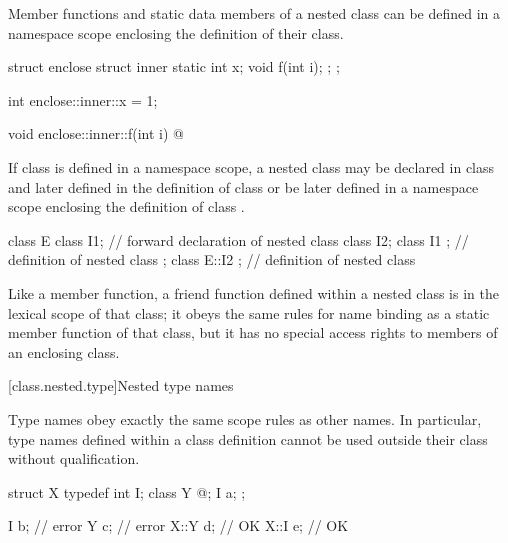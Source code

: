 \pnum
Member functions and static data members of a nested class can be
defined in a namespace scope enclosing the definition of their class.
\begin{example}
\begin{codeblock}
struct enclose {
  struct inner {
    static int x;
    void f(int i);
  };
};

int enclose::inner::x = 1;

void enclose::inner::f(int i) { @\commentellip@ }
\end{codeblock}
\end{example}

\pnum
If class  is defined in a namespace scope, a nested class
 may be declared in class  and later defined in the
definition of class  or be later defined in a namespace scope
enclosing the definition of class .
\begin{example}
\begin{codeblock}
class E {
  class I1;                     // forward declaration of nested class
  class I2;
  class I1 { };                 // definition of nested class
};
class E::I2 { };                // definition of nested class
\end{codeblock}
\end{example}

\pnum
{}%
Like a member function, a friend function defined
within a nested class is in the lexical scope of that class; it obeys
the same rules for name binding as a static member function of that
class, but it has no special access rights to
members of an enclosing class.

[class.nested.type]{Nested type names}
%
%

\pnum
Type names obey exactly the same scope rules as other names. In
particular, type names defined within a class definition cannot be used
outside their class without qualification.
\begin{example}
\begin{codeblock}
struct X {
  typedef int I;
  class Y { @\commentellip@ };
  I a;
};

I b;                            // error
Y c;                            // error
X::Y d;                         // OK
X::I e;                         // OK
\end{codeblock}
\end{example}%

